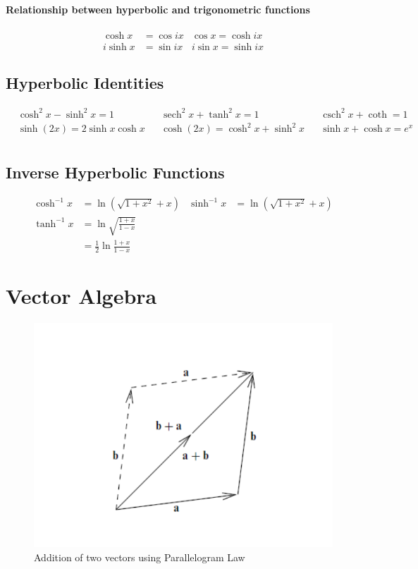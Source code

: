 \documentclass[12pt]{article}
\DeclareMathOperator{\sech}{sech}
\DeclareMathOperator{\csch}{csch}
\begin{document}
\paragraph{Relationship between hyperbolic and trigonometric functions}
\begin{align*}
\cosh x &= \cos{ix} & \cos x = \cosh{ix} \\
i\sinh x &= \sin{ix} & i\sin{x} = \sinh{ix} 
\end{align*}

\subsection{Hyperbolic Identities}
\begin{align*}
&\cosh^2 x - \sinh^2 x = 1 & &\sech^2x + \tanh^2x = 1 & &\csch^2x + \coth = 1\\
&\sinh{(2x)} = 2\sinh x\cosh x & &\cosh{(2x)} = \cosh^2x + \sinh^2{x} & &\sinh x + \cosh x = e^x \\
\end{align*}

\subsection{Inverse Hyperbolic Functions}
\begin{align*}
\cosh^{-1}x &= \ln{(\sqrt{1 + x^2} + x)} & \sinh^{-1}x &= \ln{(\sqrt{1 + x^2} + x)} \\
\tanh^{-1}x &= \ln{\sqrt{\frac{1 + x}{1 - x}}} \\
&= \frac{1}{2}\ln{\frac{1+x}{1-x}}
\end{align*}

\section{Vector Algebra}
\begin{figure}[H]
	\centering
	\includegraphics[scale=1]{figures/vector_add.pdf}
	\caption{\label{vector_add} Addition of two vectors using Parallelogram Law}
\end{figure}
\end{document}
